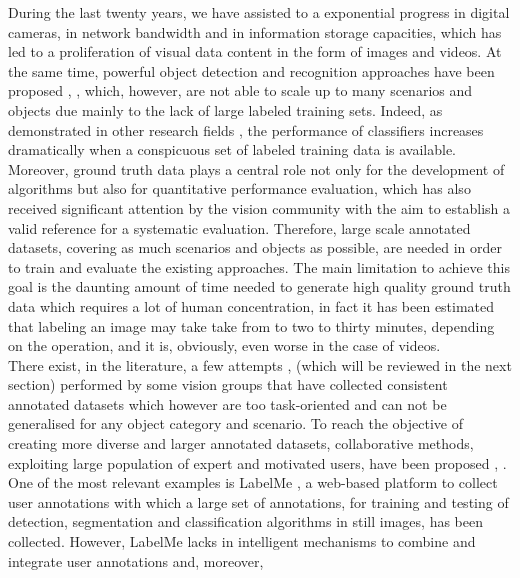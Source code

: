 During the last twenty years, we have assisted to a exponential progress in digital cameras, in network bandwidth and in information storage capacities, which has led to a proliferation of visual data content in the form of images and videos. 
At the same time, powerful object detection and recognition approaches have been proposed \cite{}, \cite{}, \cite{} which, however, are not able to scale up to many scenarios and objects due mainly to the lack of large labeled training sets.  Indeed, as demonstrated in other research fields \cite{speech}, \cite{bio} the performance of classifiers increases dramatically when a conspicuous set of labeled training data is available. Moreover, ground truth data plays a central role not only for the development of algorithms but also for quantitative performance evaluation, which has also received significant attention by the vision community with the aim to establish a valid reference for a systematic evaluation. 
Therefore,  large scale annotated datasets, covering as much scenarios and objects as possible, are needed in order to train and  evaluate the existing approaches. The main limitation to achieve this goal is the daunting amount of time needed to generate high quality ground truth data which requires a lot of human concentration, in fact it has been estimated that labeling an image may take  take from to two to thirty minutes, depending on the operation, and it is, obviously, even worse in the case of videos. \\
There exist, in the literature, a few attempts \cite{}, \cite{} (which will be reviewed in the next section) performed by some vision groups that have collected consistent annotated datasets which however are too task-oriented and can not be generalised for any object category and scenario.  
To reach the objective of creating more diverse and larger annotated datasets, collaborative methods, exploiting large population of expert and motivated users, have been proposed \cite{}, \cite{}. 
One of the most relevant examples is LabelMe \cite{}, a web-based platform to collect user annotations with which a large set of annotations, for training and testing of detection, segmentation and classification algorithms in still images, has been collected.   
However, LabelMe lacks in intelligent mechanisms to combine and integrate user annotations and, moreover,  

